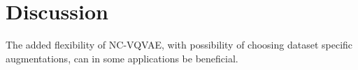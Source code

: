\documentclass[../../thesis.tex]{subfiles}
\begin{document}





\section{Discussion}
The added flexibility of NC-VQVAE, with possibility of choosing dataset specific augmentations, can in some applications be beneficial.\newline
\end{document}
